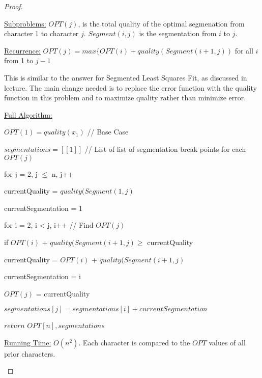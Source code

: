 \documentclass[11pt, oneside]{article}   	%
\begin{document}
\begin{proof}
\begin{description}

\underline{Subproblems:} $OPT(j)$, is the total quality of the optimal segmenation from character 1 to character $j$. $Segment(i, j)$ is the segmentation from $i$ to $j$.

\underline{Recurrence:} $OPT(j) = max \{OPT(i) + quality(Segment(i+1, j))$ for all $i$ from 1 to $j-1$

This is similar to the answer for Segmented Least Squares Fit, as discussed in lecture. The main change needed is to replace the error function with the quality function in this problem and to maximize quality rather than minimize error.

\underline{Full Algorithm:}

$OPT(1) = quality(x_1)$    \quad // Base Case

$segmentations = [[1]]$	 \quad // List of list of segmentation break points for each $OPT(j)$

for j = 2, j $\leq$ n, j++

	\quad currentQuality = $quality(Segment(1, j)$

	\quad currentSegmentation = 1

	\quad for i = 2, i < j, i++ \quad // Find $OPT(j)$

	\quad \quad if $OPT(i)$ + $quality(Segment(i+1, j) \geq$  currentQuality

	\quad \quad \quad currentQuality = $OPT(i)$ + $quality(Segment(i+1, j)$

	\quad \quad \quad currentSegmentation = i

	\quad $OPT(j)$ = currentQuality

	\quad $segmentations[j] = segmentations[i] + currentSegmentation$

$return$ $OPT[n], segmentations$

\underline{Running Time:} $O(n^2)$. Each character is compared to the $OPT$ values of all prior characters.

\end{description}
\end{proof}
\end{document}
